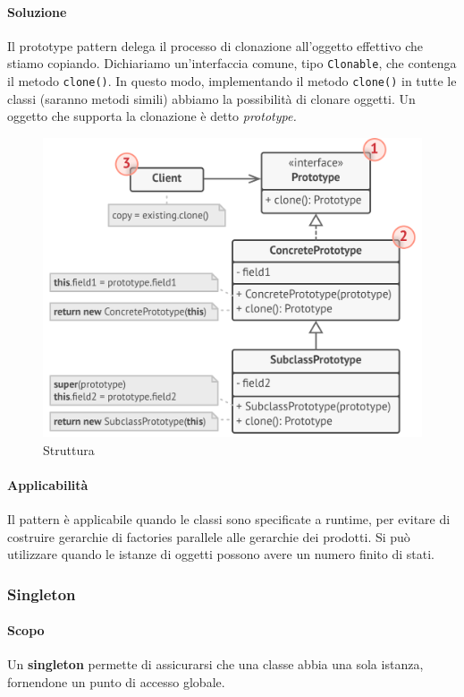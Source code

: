 \documentclass[11pt]{article}
\newcommand{\code}[1]{\texttt{#1}}
\begin{document}
\paragraph{Soluzione}
Il prototype pattern delega il processo di clonazione all'oggetto effettivo che stiamo copiando. Dichiariamo un'interfaccia comune, tipo \code{Clonable}, che contenga il metodo \code{clone()}. In questo modo, implementando il metodo \code{clone()} in tutte le classi (saranno metodi simili) abbiamo la possibilità di clonare oggetti. Un oggetto che supporta la clonazione è detto \textit{prototype.}
\begin{figure}[H]
    \centering
    \includegraphics[width=\linewidth]{res/teoria/Prototype.png}
    \caption{Struttura}
\end{figure}
\paragraph{Applicabilità}
Il pattern è applicabile quando le classi sono specificate a runtime, per evitare di costruire gerarchie di factories parallele alle gerarchie dei prodotti. Si può utilizzare quando le istanze di oggetti possono avere un numero finito di stati.

\subsubsection{Singleton}
\paragraph{Scopo}
Un \textbf{singleton} permette di assicurarsi che una classe abbia una sola istanza, fornendone un punto di accesso globale.
\end{document}
